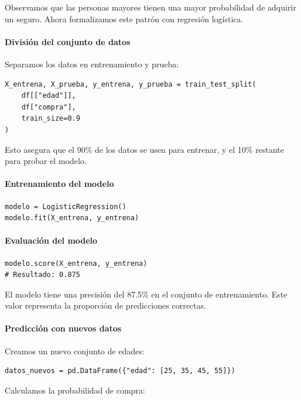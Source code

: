 \documentclass{article}
\theoremstyle{nonumberplain}
\begin{document}
Observamos que las personas mayores tienen una mayor probabilidad de adquirir un seguro. Ahora formalizamos este patrón con regresión logística.

\paragraph{División del conjunto de datos}

Separamos los datos en entrenamiento y prueba:

\begin{verbatim}
X_entrena, X_prueba, y_entrena, y_prueba = train_test_split(
    df[["edad"]],
    df["compra"],
    train_size=0.9
)
\end{verbatim}

Esto asegura que el 90\% de los datos se usen para entrenar, y el 10\% restante para probar el modelo.

\paragraph{Entrenamiento del modelo}

\begin{verbatim}
modelo = LogisticRegression()
modelo.fit(X_entrena, y_entrena)
\end{verbatim}

\paragraph{Evaluación del modelo}

\begin{verbatim}
modelo.score(X_entrena, y_entrena)
# Resultado: 0.875
\end{verbatim}

El modelo tiene una precisión del 87.5\% en el conjunto de entrenamiento. Este valor representa la proporción de predicciones correctas.

\paragraph{Predicción con nuevos datos}

Creamos un nuevo conjunto de edades:

\begin{verbatim}
datos_nuevos = pd.DataFrame({"edad": [25, 35, 45, 55]})
\end{verbatim}

Calculamos la probabilidad de compra:
\end{document}
